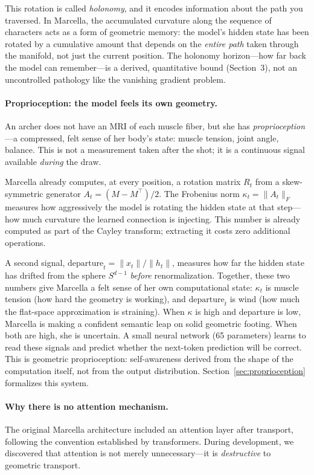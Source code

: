 \documentclass[11pt,a4paper]{article}
\theoremstyle{definition}
\theoremstyle{remark}
\begin{document}
This rotation is called \emph{holonomy}, and it encodes information about the path you traversed. In Marcella, the accumulated curvature along the sequence of characters acts as a form of geometric memory: the model's hidden state has been rotated by a cumulative amount that depends on the \emph{entire path} taken through the manifold, not just the current position. The holonomy horizon---how far back the model can remember---is a derived, quantitative bound (Section~3), not an uncontrolled pathology like the vanishing gradient problem.

\paragraph{Proprioception: the model feels its own geometry.}
An archer does not have an MRI of each muscle fiber, but she has \emph{proprioception}---a compressed, felt sense of her body's state: muscle tension, joint angle, balance. This is not a measurement taken after the shot; it is a continuous signal available \emph{during} the draw.

Marcella already computes, at every position, a rotation matrix $R_t$ from a skew-symmetric generator $A_t = (M - M^\top)/2$. The Frobenius norm $\kappa_t = \|A_t\|_F$ measures how aggressively the model is rotating the hidden state at that step---how much curvature the learned connection is injecting. This number is already computed as part of the Cayley transform; extracting it costs zero additional operations.

A second signal, $\mathrm{departure}_t = \|x_t\|/\|h_t\|$, measures how far the hidden state has drifted from the sphere $S^{d-1}$ \emph{before} renormalization. Together, these two numbers give Marcella a felt sense of her own computational state: $\kappa_t$ is muscle tension (how hard the geometry is working), and $\mathrm{departure}_t$ is wind (how much the flat-space approximation is straining). When $\kappa$ is high and departure is low, Marcella is making a confident semantic leap on solid geometric footing. When both are high, she is uncertain. A small neural network (65 parameters) learns to read these signals and predict whether the next-token prediction will be correct. This is geometric proprioception: self-awareness derived from the shape of the computation itself, not from the output distribution. Section~\ref{sec:proprioception} formalizes this system.

\paragraph{Why there is no attention mechanism.}
The original Marcella architecture included an attention layer after transport, following the convention established by transformers. During development, we discovered that attention is not merely unnecessary---it is \emph{destructive} to geometric transport.
\end{document}
